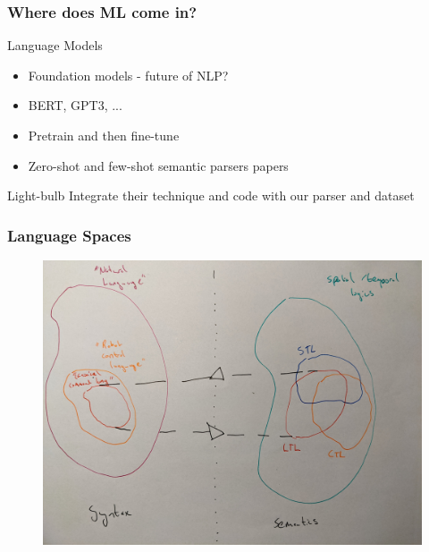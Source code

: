 \documentclass{beamer}
\begin{document}
\begin{frame}
\frametitle{Where does ML come in?}

\begin{exampleblock}{Language Models}
\begin{itemize}[<+->]
\item Foundation models - future of NLP?
\item BERT, GPT3, ...
\item Pretrain and then fine-tune
\item Zero-shot and few-shot semantic parsers papers
\end{itemize}
\end{exampleblock}
\pause
\begin{alertblock}{Light-bulb}
Integrate their technique and code with our parser and dataset
\end{alertblock}

\end{frame}


\begin{frame}
\frametitle{Language Spaces}
\begin{figure}
\hspace*{-3mm}%
   \includegraphics[width= \paperwidth]{pics/one.jpg}
\end{figure}
\end{frame}
\end{document}
